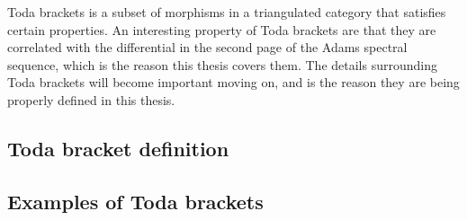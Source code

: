 Toda brackets is a subset of morphisms in a triangulated category that satisfies certain properties. An interesting property of Toda brackets are that they are correlated with the differential in the second page of the Adams spectral sequence, which is the reason this thesis covers them. The details surrounding Toda brackets will become important moving on, and is the reason they are being properly defined in this thesis.

\subsection{Toda bracket definition}


\subsection{Examples of Toda brackets}

